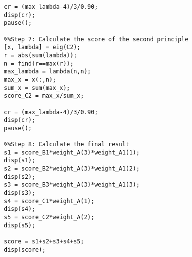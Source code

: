 \documentclass[UTF8]{ctexart}
\begin{document}
\begin{lstlisting}
cr = (max_lambda-4)/3/0.90;
disp(cr);
pause();

%%Step 7: Calculate the score of the second principle
[x, lambda] = eig(C2);
r = abs(sum(lambda));
n = find(r==max(r));
max_lambda = lambda(n,n);
max_x = x(:,n);
sum_x = sum(max_x);
score_C2 = max_x/sum_x;

cr = (max_lambda-4)/3/0.90;
disp(cr);
pause();

%%Step 8: Calculate the final result
s1 = score_B1*weight_A(3)*weight_A1(1);
disp(s1);
s2 = score_B2*weight_A(3)*weight_A1(2);
disp(s2);
s3 = score_B3*weight_A(3)*weight_A1(3);
disp(s3);
s4 = score_C1*weight_A(1);
disp(s4);
s5 = score_C2*weight_A(2);
disp(s5);

score = s1+s2+s3+s4+s5;
disp(score);
\end{lstlisting}
\end{document}
